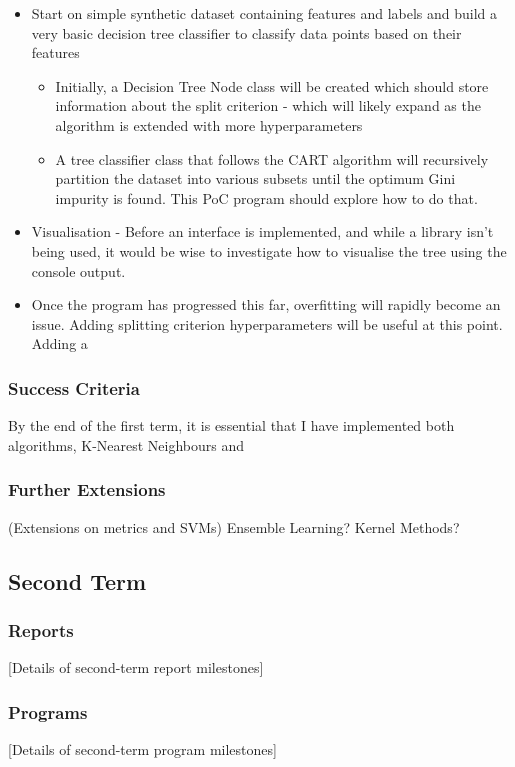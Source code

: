 \documentclass[report,10pt]{article}
\begin{document}
\begin{itemize}
    \item Start on simple synthetic dataset containing features and labels and build a very basic decision tree classifier to classify data points based on their features
    \begin{itemize}
        \item Initially, a Decision Tree Node class will be created which should store information about the split criterion - which will likely expand as the algorithm is extended with more hyperparameters
        \item A tree classifier class that follows the CART algorithm will recursively partition the dataset into various subsets until the optimum Gini impurity is found. This PoC program should explore how to do that.
    \end{itemize}
    \item Visualisation - Before an interface is implemented, and while a library isn't being used, it would be wise to investigate how to visualise the tree using the console output.
    \item Once the program has progressed this far, overfitting will rapidly become an issue. Adding splitting criterion hyperparameters will be useful at this point. Adding a 
\end{itemize}
\subsubsection{Success Criteria}
By the end of the first term, it is essential that I have implemented both algorithms, K-Nearest Neighbours and 
\subsubsection{Further Extensions}
(Extensions on metrics and SVMs) Ensemble Learning? Kernel Methods?

\subsection{Second Term}
\subsubsection{Reports}
[Details of second-term report milestones]

\subsubsection{Programs}
[Details of second-term program milestones]
\end{document}
